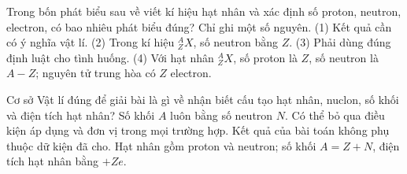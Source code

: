 \begin{ex}
Trong bốn phát biểu sau về viết kí hiệu hạt nhân và xác định số proton, neutron, electron, có bao nhiêu phát biểu đúng? Chỉ ghi một số nguyên. (1) Kết quả cần có ý nghĩa vật lí. (2) Trong kí hiệu $^{A}_{Z}X$, số neutron bằng $Z$. (3) Phải dùng đúng định luật cho tình huống. (4) Với hạt nhân $^{A}_{Z}X$, số proton là $Z$, số neutron là $A-Z$; nguyên tử trung hòa có $Z$ electron.
\end{ex}

\begin{ex}
Cơ sở Vật lí đúng để giải bài là gì về nhận biết cấu tạo hạt nhân, nuclon, số khối và điện tích hạt nhân?
\choice
{Số khối $A$ luôn bằng số neutron $N$.}
{Có thể bỏ qua điều kiện áp dụng và đơn vị trong mọi trường hợp.}
{Kết quả của bài toán không phụ thuộc dữ kiện đã cho.}
{\True Hạt nhân gồm proton và neutron; số khối $A=Z+N$, điện tích hạt nhân bằng $+Ze$.}
\end{ex}

